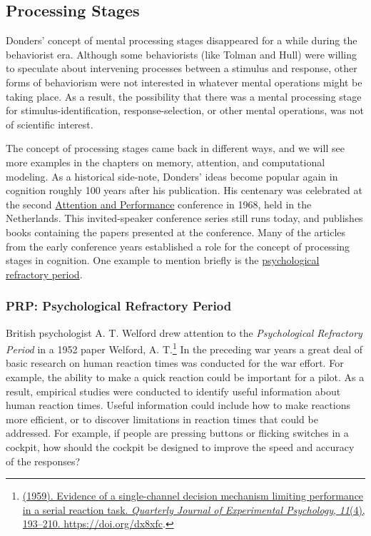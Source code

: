 \documentclass[
  oneside,
  12pt]{crumpbook}
\begin{document}
\hypertarget{processing-stages}{%
\subsection{Processing Stages}\label{processing-stages}}

Donders' concept of mental processing stages disappeared for a while during the behaviorist era. Although some behaviorists (like Tolman and Hull) were willing to speculate about intervening processes between a stimulus and response, other forms of behaviorism were not interested in whatever mental operations might be taking place. As a result, the possibility that there was a mental processing stage for stimulus-identification, response-selection, or other mental operations, was not of scientific interest.

The concept of processing stages came back in different ways, and we will see more examples in the chapters on memory, attention, and computational modeling. As a historical side-note, Donders' ideas become popular again in cognition roughly 100 years after his publication. His centenary was celebrated at the second \href{http://www.attentionandperformance.org}{Attention and Performance} conference in 1968, held in the Netherlands. This invited-speaker conference series still runs today, and publishes books containing the papers presented at the conference. Many of the articles from the early conference years established a role for the concept of processing stages in cognition. One example to mention briefly is the \href{https://en.wikipedia.org/wiki/Psychological_refractory_period}{psychological refractory period}.

\hypertarget{prp-psychological-refractory-period}{%
\subsubsection{PRP: Psychological Refractory Period}\label{prp-psychological-refractory-period}}

British psychologist A. T. Welford drew attention to the \emph{Psychological Refractory Period} in a 1952 paper Welford, A. T.\footnote{\protect\hyperlink{ref-welfordEvidenceSinglechannelDecision1959}{(1959). Evidence of a single-channel decision mechanism limiting performance in a serial reaction task. \emph{Quarterly Journal of Experimental Psychology}, \emph{11}(4), 193--210. \url{https://doi.org/dx8xfc}}.} In the preceding war years a great deal of basic research on human reaction times was conducted for the war effort. For example, the ability to make a quick reaction could be important for a pilot. As a result, empirical studies were conducted to identify useful information about human reaction times. Useful information could include how to make reactions more efficient, or to discover limitations in reaction times that could be addressed. For example, if people are pressing buttons or flicking switches in a cockpit, how should the cockpit be designed to improve the speed and accuracy of the responses?
\end{document}
